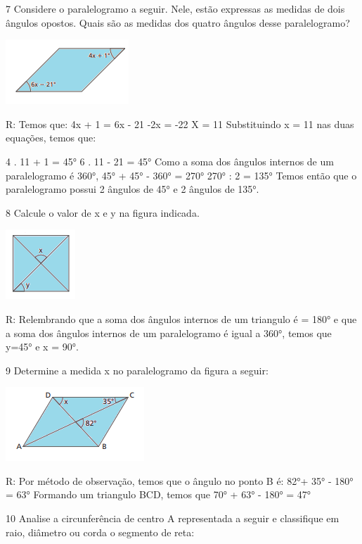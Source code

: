 {\num{7} Considere o paralelogramo a seguir. Nele, estão expressas as medidas
de dois ângulos opostos. Quais são as medidas dos quatro ângulos desse
paralelogramo?

\includegraphics[width=1.82292in,height=0.95833in]{./imgSAEB_8_MAT/media/image9.png}

R: Temos que:
4x + 1 = 6x - 21
-2x = -22
X = 11
Substituindo x = 11 nas duas equações, temos que:

4 . 11 + 1 = 45°
6 . 11 - 21 = 45°
Como a soma dos ângulos internos de um paralelogramo é 360°,
45° + 45° - 360° = 270°
270° : 2 = 135°
Temos então que o paralelogramo possui 2 ângulos de 45° e 2 ângulos de
135°.

\num{8} Calcule o valor de x e y na figura indicada.

\includegraphics[width=1.03125in,height=1.03125in]{./imgSAEB_8_MAT/media/image10.png}

R: Relembrando que a soma dos ângulos internos de um triangulo é = 180° e
que a soma dos ângulos internos de um paralelogramo é igual a 360°,
temos que y=45° e x = 90°.

\num{9} Determine a medida x no paralelogramo da figura a seguir:

\includegraphics[width=2.05208in,height=1.09375in]{./imgSAEB_8_MAT/media/image11.png}

R: Por método de observação, temos que o ângulo no ponto B é:
82°+ 35° - 180° = 63°
Formando um triangulo BCD, temos que
70° + 63° - 180° = 47°

\num{10} Analise a circunferência de centro A representada a seguir e
classifique em raio, diâmetro ou corda o segmento de reta:

}
